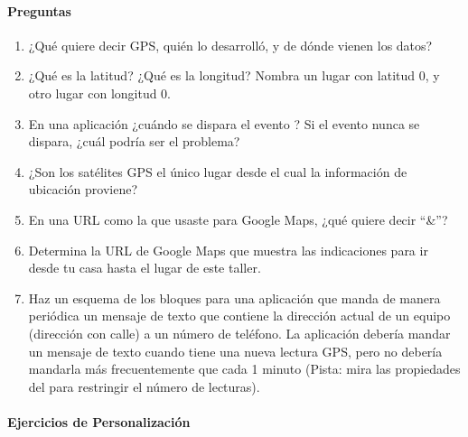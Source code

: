\paragraph{Preguntas}

\begin{enumerate}

\item ¿Qué quiere decir GPS, quién lo desarrolló, y de dónde vienen
  los datos?

\item ¿Qué es la latitud? ¿Qué es la longitud? Nombra un lugar con
  latitud 0, y otro lugar con longitud 0.

\item En una aplicación \AppInventor ¿cuándo se dispara el evento
  ? Si el evento nunca se
  dispara, ¿cuál podría ser el problema?

\item ¿Son los satélites GPS el único lugar desde el cual la
  información de ubicación proviene?

\item En una URL como la que usaste para Google Maps, ¿qué quiere
  decir ``\&''?

\item Determina la URL de Google Maps que muestra las indicaciones
  para ir desde tu casa hasta el lugar de este taller.

\item Haz un esquema de los bloques para una aplicación que manda de
  manera periódica un mensaje de texto que contiene la dirección
  actual de un equipo (dirección con calle) a un número de
  teléfono. La aplicación debería mandar un mensaje de texto cuando
  tiene una nueva lectura GPS, pero no debería mandarla más
  frecuentemente que cada 1 minuto (Pista: mira las propiedades del
   para restringir el número de
  lecturas).

\end{enumerate}

\paragraph{Ejercicios de Personalización}


